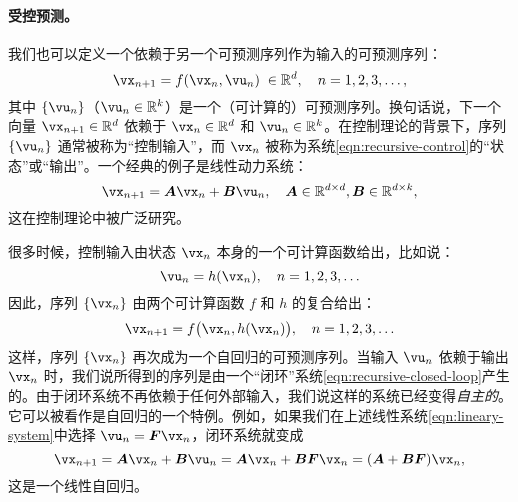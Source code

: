 \documentclass[../../book-main_zh.tex]{subfiles}
\begin{document}
\paragraph{受控预测。}
我们也可以定义一个依赖于另一个可预测序列作为输入的可预测序列：
\begin{equation}
    \vx_{n+1} = f(\vx_{n}, \vu_n) \; \in \mathbb{R}^d, \quad n =  1, 2, 3, \ldots,
\label{eqn:recursive-control}
\end{equation}
其中 $\{\vu_n\}$（$\vu_n \in \mathbb{R}^k$）是一个（可计算的）可预测序列。换句话说，下一个向量 $\vx_{n+1} \in \mathbb{R}^d$ 依赖于 $\vx_n \in \mathbb{R}^d$ 和 $\vu_n \in \mathbb{R}^k$。在控制理论的背景下，序列 $\{\vu_n\}$ 通常被称为“控制输入”，而 $\vx_n$ 被称为系统\eqref{eqn:recursive-control}的“状态”或“输出”。一个经典的例子是线性动力系统：
\begin{equation}
    \vx_{n+1} = \boldsymbol{A}\vx_n + \boldsymbol{B}\vu_n, \quad \boldsymbol{A} \in \mathbb{R}^{d\times d}, \boldsymbol{B} \in \mathbb{R}^{d\times k},
    \label{eqn:lineary-system} 
\end{equation}
这在控制理论中被广泛研究\cite{Cal:Des}。

很多时候，控制输入由状态 $\vx_n$ 本身的一个可计算函数给出，比如说：
\begin{equation}
    \vu_n = h(\vx_n), \quad n =  1, 2, 3, \ldots 
\end{equation}
因此，序列 $\{\vx_n\}$ 由两个可计算函数 $f$ 和 $h$ 的复合给出：
\begin{equation}
    \vx_{n+1} = f\big(\vx_{n}, h(\vx_n)\big), \quad n =  1, 2, 3, \ldots
    \label{eqn:recursive-closed-loop}
\end{equation}
这样，序列 $\{\vx_n\}$ 再次成为一个自回归的可预测序列。当输入 $\vu_n$ 依赖于输出 $\vx_n$ 时，我们说所得到的序列是由一个“闭环”系统\eqref{eqn:recursive-closed-loop}产生的。由于闭环系统不再依赖于任何外部输入，我们说这样的系统已经变得{\em 自主的}。它可以被看作是自回归的一个特例。例如，如果我们在上述线性系统\eqref{eqn:lineary-system}中选择 $\vu_n = \boldsymbol{F}\vx_n$，闭环系统就变成
\begin{equation}
        \vx_{n+1} = \boldsymbol{A}\vx_n + \boldsymbol{B}\vu_n = \boldsymbol{A}\vx_n + \boldsymbol{B}\boldsymbol{F}\vx_n = (\boldsymbol{A}+ \boldsymbol{B}\boldsymbol{F})\vx_n,
    \label{eqn:lineary-system-closed}
\end{equation}
这是一个线性自回归。

\end{document}
